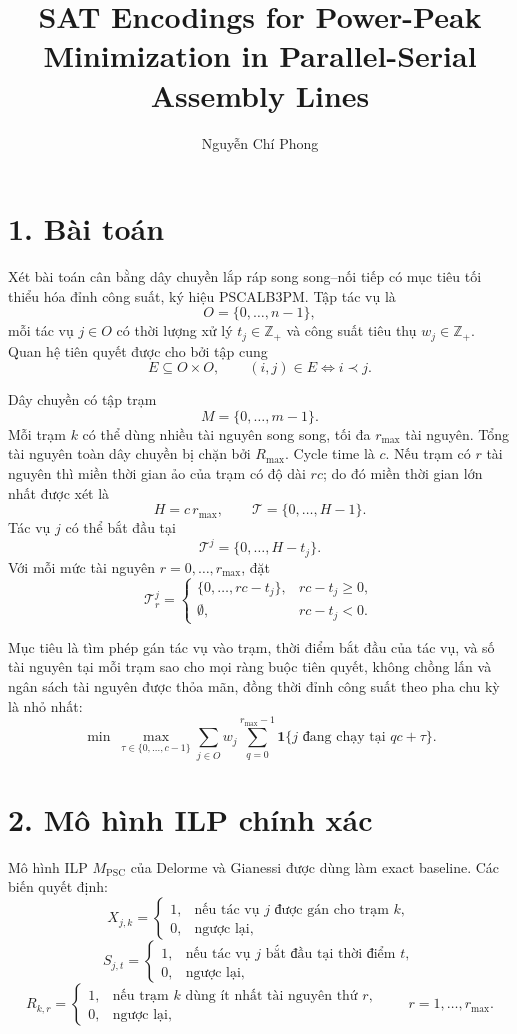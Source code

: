 \documentclass[12pt]{article}
\title{SAT Encodings for Power-Peak Minimization in Parallel-Serial Assembly Lines}
\author{Nguyễn Chí Phong}
\date{}
\begin{document}
\maketitle

\section*{1. Bài toán}

Xét bài toán cân bằng dây chuyền lắp ráp song song--nối tiếp có mục tiêu tối thiểu hóa đỉnh công suất, ký hiệu PSCALB3PM. Tập tác vụ là
\[
O=\{0,\ldots,n-1\},
\]
mỗi tác vụ $j\in O$ có thời lượng xử lý $t_j\in\mathbb{Z}_{+}$ và công suất tiêu thụ $w_j\in\mathbb{Z}_{+}$. Quan hệ tiên quyết được cho bởi tập cung
\[
E\subseteq O\times O,\qquad (i,j)\in E \Longleftrightarrow i\prec j.
\]

Dây chuyền có tập trạm
\[
M=\{0,\ldots,m-1\}.
\]
Mỗi trạm $k$ có thể dùng nhiều tài nguyên song song, tối đa $r_{\max}$ tài nguyên. Tổng tài nguyên toàn dây chuyền bị chặn bởi $R_{\max}$. Cycle time là $c$. Nếu trạm có $r$ tài nguyên thì miền thời gian ảo của trạm có độ dài $rc$; do đó miền thời gian lớn nhất được xét là
\[
H = c\,r_{\max},\qquad
\mathcal{T}=\{0,\ldots,H-1\}.
\]
Tác vụ $j$ có thể bắt đầu tại
\[
\mathcal{T}^{j}=\{0,\ldots,H-t_j\}.
\]
Với mỗi mức tài nguyên $r=0,\ldots,r_{\max}$, đặt
\[
\mathcal{T}^{j}_{r}=
\begin{cases}
\{0,\ldots,rc-t_j\},& rc-t_j\ge 0,\\
\emptyset,& rc-t_j<0.
\end{cases}
\]

Mục tiêu là tìm phép gán tác vụ vào trạm, thời điểm bắt đầu của tác vụ, và số tài nguyên tại mỗi trạm sao cho mọi ràng buộc tiên quyết, không chồng lấn và ngân sách tài nguyên được thỏa mãn, đồng thời đỉnh công suất theo pha chu kỳ là nhỏ nhất:
\[
\min\ \max_{\tau\in\{0,\ldots,c-1\}}
\sum_{j\in O} w_j
\sum_{q=0}^{r_{\max}-1}
\mathbf{1}\{j\text{ đang chạy tại }qc+\tau\}.
\]

\section*{2. Mô hình ILP chính xác}

Mô hình ILP $M_{\mathrm{PSC}}$ của Delorme và Gianessi được dùng làm exact baseline. Các biến quyết định:
\[
X_{j,k} =
\begin{cases}
1,&\text{nếu tác vụ }j\text{ được gán cho trạm }k,\\
0,&\text{ngược lại,}
\end{cases}
\]
\[
S_{j,t} =
\begin{cases}
1,&\text{nếu tác vụ }j\text{ bắt đầu tại thời điểm }t,\\
0,&\text{ngược lại,}
\end{cases}
\]
\[
R_{k,r} =
\begin{cases}
1,&\text{nếu trạm }k\text{ dùng ít nhất tài nguyên thứ }r,\\
0,&\text{ngược lại,}
\end{cases}
\qquad r=1,\ldots,r_{\max}.
\]
\end{document}
